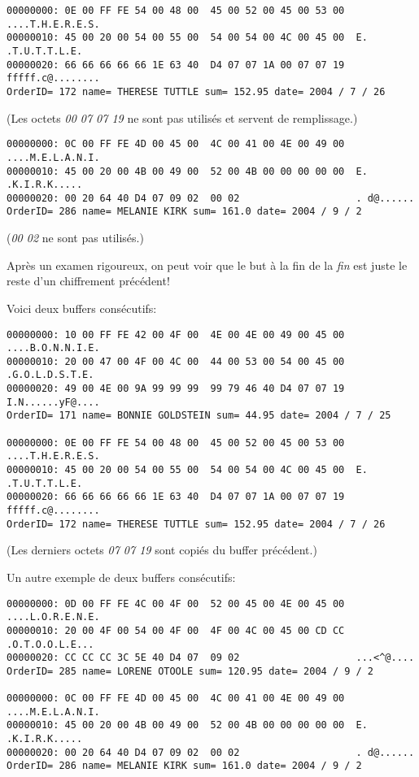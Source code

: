 \begin{lstlisting}
00000000: 0E 00 FF FE 54 00 48 00  45 00 52 00 45 00 53 00  ....T.H.E.R.E.S.
00000010: 45 00 20 00 54 00 55 00  54 00 54 00 4C 00 45 00  E. .T.U.T.T.L.E.
00000020: 66 66 66 66 66 1E 63 40  D4 07 07 1A 00 07 07 19  fffff.c@........
OrderID= 172 name= THERESE TUTTLE sum= 152.95 date= 2004 / 7 / 26
\end{lstlisting}

(Les octets \emph{00 07 07 19} ne sont pas utilisés et servent de remplissage.)

\begin{lstlisting}
00000000: 0C 00 FF FE 4D 00 45 00  4C 00 41 00 4E 00 49 00  ....M.E.L.A.N.I.
00000010: 45 00 20 00 4B 00 49 00  52 00 4B 00 00 00 00 00  E. .K.I.R.K.....
00000020: 00 20 64 40 D4 07 09 02  00 02                    . d@......
OrderID= 286 name= MELANIE KIRK sum= 161.0 date= 2004 / 9 / 2
\end{lstlisting}

(\emph{00 02} ne sont pas utilisés.)

Après un examen rigoureux, on peut voir que le but à la fin de la \emph{fin} est
juste le reste d'un chiffrement précédent!

Voici deux buffers consécutifs:

\begin{lstlisting}
00000000: 10 00 FF FE 42 00 4F 00  4E 00 4E 00 49 00 45 00  ....B.O.N.N.I.E.
00000010: 20 00 47 00 4F 00 4C 00  44 00 53 00 54 00 45 00   .G.O.L.D.S.T.E.
00000020: 49 00 4E 00 9A 99 99 99  99 79 46 40 D4 07 07 19  I.N......yF@....
OrderID= 171 name= BONNIE GOLDSTEIN sum= 44.95 date= 2004 / 7 / 25

00000000: 0E 00 FF FE 54 00 48 00  45 00 52 00 45 00 53 00  ....T.H.E.R.E.S.
00000010: 45 00 20 00 54 00 55 00  54 00 54 00 4C 00 45 00  E. .T.U.T.T.L.E.
00000020: 66 66 66 66 66 1E 63 40  D4 07 07 1A 00 07 07 19  fffff.c@........
OrderID= 172 name= THERESE TUTTLE sum= 152.95 date= 2004 / 7 / 26
\end{lstlisting}

(Les derniers octets \emph{07 07 19} sont copiés du buffer précédent.) 

Un autre exemple de deux buffers consécutifs:

\begin{lstlisting}
00000000: 0D 00 FF FE 4C 00 4F 00  52 00 45 00 4E 00 45 00  ....L.O.R.E.N.E.
00000010: 20 00 4F 00 54 00 4F 00  4F 00 4C 00 45 00 CD CC   .O.T.O.O.L.E...
00000020: CC CC CC 3C 5E 40 D4 07  09 02                    ...<^@....
OrderID= 285 name= LORENE OTOOLE sum= 120.95 date= 2004 / 9 / 2

00000000: 0C 00 FF FE 4D 00 45 00  4C 00 41 00 4E 00 49 00  ....M.E.L.A.N.I.
00000010: 45 00 20 00 4B 00 49 00  52 00 4B 00 00 00 00 00  E. .K.I.R.K.....
00000020: 00 20 64 40 D4 07 09 02  00 02                    . d@......
OrderID= 286 name= MELANIE KIRK sum= 161.0 date= 2004 / 9 / 2
\end{lstlisting}


